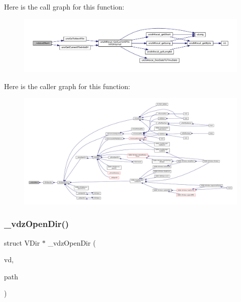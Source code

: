 Here is the call graph for this function\+:
\nopagebreak
\begin{figure}[H]
\begin{center}
\leavevmode
\includegraphics[width=350pt]{vfs-zip_8c_a530f0797de537841abac89088d73e20a_cgraph}
\end{center}
\end{figure}
Here is the caller graph for this function\+:
\nopagebreak
\begin{figure}[H]
\begin{center}
\leavevmode
\includegraphics[width=350pt]{vfs-zip_8c_a530f0797de537841abac89088d73e20a_icgraph}
\end{center}
\end{figure}
\mbox{\label{vfs-zip_8c_a69eab4c663a9a5f03f615134ef62db34}} 
\subsubsection{\texorpdfstring{\+\_\+vdz\+Open\+Dir()}{\_vdzOpenDir()}}
{\footnotesize\ttfamily struct V\+Dir $\ast$ \+\_\+vdz\+Open\+Dir (\begin{DoxyParamCaption}\item[{struct V\+Dir $\ast$}]{vd,  }\item[{const char $\ast$}]{path }\end{DoxyParamCaption})\hspace{0.3cm}{\ttfamily [static]}}

